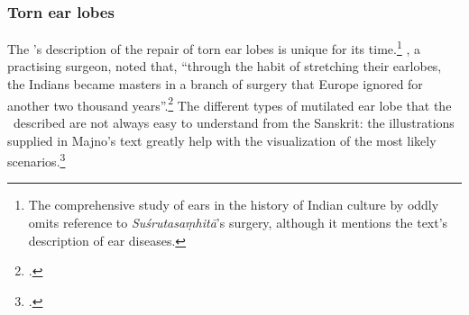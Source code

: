 %



\subsubsection{Torn ear lobes}

The \SS's description of the repair of torn ear lobes is  unique for its
time.\footnote{The comprehensive study of ears in the history of Indian culture by
    \citet{boll-2010} oddly omits reference to \emph{Suśrutasaṃhitā}'s surgery,
    although it mentions the text's description of ear diseases.}
    \citeauthor{majn-1975}, a practising surgeon, noted that, “through the habit of
    stretching their earlobes, the Indians became masters in a branch of surgery that
    Europe ignored for another two thousand years”.\footcite[291]{majn-1975} The
    different types of mutilated ear lobe that the \SS\ described are not always easy
    to understand from the Sanskrit: the illustrations supplied in Majno's text
    greatly help with the visualization of the most likely
    scenarios.\footcites[290--291]{majn-1975}[reproduced with permission
    in][92--93]{wuja-2003}

